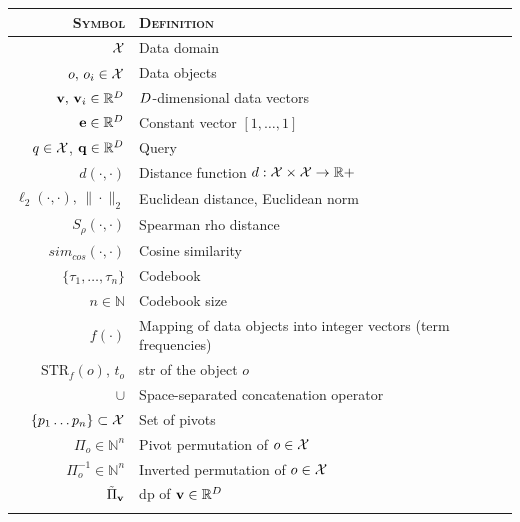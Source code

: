 \begin{table}
\begin{tabularx}{\linewidth}{rX}
\toprule
\textsc{Symbol} & \textsc{Definition} \\
\midrule
$\mathcal{X}$                                           & Data domain \\ \addlinespace[0.5em]
$o,\, o_i \in \mathcal{X}$                              & Data objects \\ \addlinespace[0.5em]
$\mathbf{v},\, \mathbf{v}_i \in \mathbb{R}^{{D}}$                       & ${D}$-dimensional data vectors \\ \addlinespace[0.5em]
$\mathbf{e} \in \mathbb{R}^{{D}}$                               & Constant vector $[1,\dots, 1]$ \\ \addlinespace[0.5em]
$q \in \mathcal{X}$, $\mathbf{q} \in \mathbb{R}^{{D}}$                   & Query  \\ \addlinespace[0.5em]
$d(\cdot, \cdot)$                              & Distance function $d: \mathcal{X} \times \mathcal{X} \to \mathbb{R}+$ \\ \addlinespace[0.5em]
$\ell_2(\cdot, \cdot), \, \|\cdot\|_2$         & Euclidean distance, Euclidean norm  \\ \addlinespace[0.5em]
$S_{\rho}(\cdot, \cdot)$                       & Spearman rho distance \\ \addlinespace[0.5em]
$sim_{cos}(\cdot, \cdot)$                      & Cosine similarity \\ \addlinespace[0.5em]
$\{\tau_1, \dots, \tau_n\}$                    & Codebook \\ \addlinespace[0.5em]
$n \in \mathbb{N}$                             & Codebook size \\ \addlinespace[0.5em]
$f(\cdot)$                                     & Mapping of data objects into integer vectors (term frequencies) \\ \addlinespace[0.5em]
$\text{STR}_f(o),\, t_o$                       & \acrfull{str} of the object $o$ \\ \addlinespace[0.5em]
$\cup$                                         & Space-separated concatenation operator \\ \addlinespace[0.5em]
$\{p_1\ldots p_n\}\subset\mathcal{X}$                   & Set of pivots \\ \addlinespace[0.5em]
$\Pi_{o} \in \mathbb{N}^n$                     & Pivot permutation of $o \in \mathcal{X}$ \\ \addlinespace[0.5em]
$\Pi_{o}^{-1} \in \mathbb{N}^n$                & Inverted permutation of $o \in \mathcal{X}$ \\ \addlinespace[0.5em]
$\tilde{\Pi}_{\mathbf{v}}$                             & \acrfull{dp} of $\mathbf{v} \in \mathbb{R}^{D}$ \\ \addlinespace[0.5em]

\end{tabularx}
\end{table}
